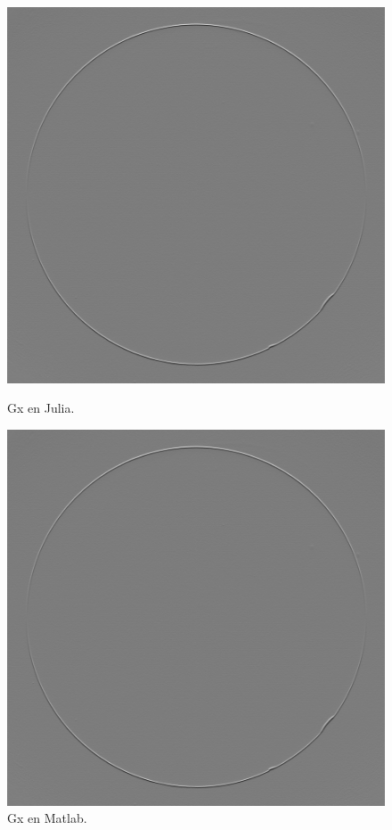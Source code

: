 \documentclass[11pt, letterpaper]{article}
\begin{document}
\begin{figure}[h]
	
	\begin{minipage}{0.48\textwidth} %
		\centering
		\includegraphics[width=\textwidth]{IMG/q21.png} %
		\caption{Gx en Julia.}
		\label{fig:img2}
	\end{minipage}\hfill %
	\begin{minipage}{0.48\textwidth} %
		\centering
		\includegraphics[width=\textwidth]{IMG/q2.png} %
		\caption{Gx en Matlab.}
		\label{fig:img3}
	\end{minipage}
	

\end{figure}
\end{document}

